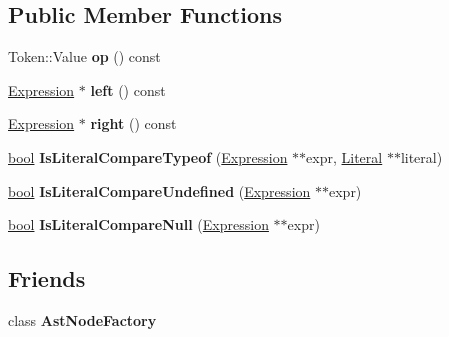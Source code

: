 \subsection*{Public Member Functions}
\begin{DoxyCompactItemize}
\item 
\mbox{\label{classv8_1_1internal_1_1CompareOperation_a00e45cfc1181a005f30c66b1b723d771}} 
Token\+::\+Value {\bfseries op} () const
\item 
\mbox{\label{classv8_1_1internal_1_1CompareOperation_a29e2cb23327d31ef1dfbd3796aa05587}} 
\mbox{\hyperlink{classv8_1_1internal_1_1Expression}{Expression}} $\ast$ {\bfseries left} () const
\item 
\mbox{\label{classv8_1_1internal_1_1CompareOperation_af5a25ac967f4dc51e57ffdacbdc223fe}} 
\mbox{\hyperlink{classv8_1_1internal_1_1Expression}{Expression}} $\ast$ {\bfseries right} () const
\item 
\mbox{\label{classv8_1_1internal_1_1CompareOperation_a46109b2f8efa888dfd4a1617f7b859d4}} 
\mbox{\hyperlink{classbool}{bool}} {\bfseries Is\+Literal\+Compare\+Typeof} (\mbox{\hyperlink{classv8_1_1internal_1_1Expression}{Expression}} $\ast$$\ast$expr, \mbox{\hyperlink{classv8_1_1internal_1_1Literal}{Literal}} $\ast$$\ast$literal)
\item 
\mbox{\label{classv8_1_1internal_1_1CompareOperation_aab66b8096d3e5be49701799ac650529d}} 
\mbox{\hyperlink{classbool}{bool}} {\bfseries Is\+Literal\+Compare\+Undefined} (\mbox{\hyperlink{classv8_1_1internal_1_1Expression}{Expression}} $\ast$$\ast$expr)
\item 
\mbox{\label{classv8_1_1internal_1_1CompareOperation_aade6a47a782271dad8a9eca9dc89dc82}} 
\mbox{\hyperlink{classbool}{bool}} {\bfseries Is\+Literal\+Compare\+Null} (\mbox{\hyperlink{classv8_1_1internal_1_1Expression}{Expression}} $\ast$$\ast$expr)
\end{DoxyCompactItemize}
\subsection*{Friends}
\begin{DoxyCompactItemize}
\item 
\mbox{\label{classv8_1_1internal_1_1CompareOperation_a8d587c8ad3515ff6433eb83c578e795f}} 
class {\bfseries Ast\+Node\+Factory}
\end{DoxyCompactItemize}
